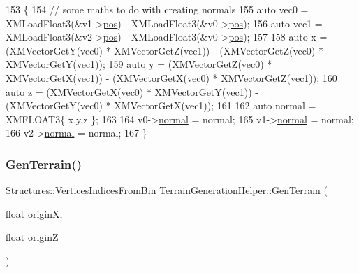 \begin{DoxyCode}
153 \{
154     \textcolor{comment}{// some maths to do with creating normals}
155     \textcolor{keyword}{auto} vec0 = XMLoadFloat3(&v1->\mbox{\hyperlink{struct_structures_1_1_vertex_tex_coord_normal_ae9f706af7cd80e03ef433eff59f7419e}{pos}}) - XMLoadFloat3(&v0->\mbox{\hyperlink{struct_structures_1_1_vertex_tex_coord_normal_ae9f706af7cd80e03ef433eff59f7419e}{pos}});
156     \textcolor{keyword}{auto} vec1 = XMLoadFloat3(&v2->\mbox{\hyperlink{struct_structures_1_1_vertex_tex_coord_normal_ae9f706af7cd80e03ef433eff59f7419e}{pos}}) - XMLoadFloat3(&v0->\mbox{\hyperlink{struct_structures_1_1_vertex_tex_coord_normal_ae9f706af7cd80e03ef433eff59f7419e}{pos}});
157     
158     \textcolor{keyword}{auto} x = (XMVectorGetY(vec0) * XMVectorGetZ(vec1)) - (XMVectorGetZ(vec0) * XMVectorGetY(vec1));
159     \textcolor{keyword}{auto} y = (XMVectorGetZ(vec0) * XMVectorGetX(vec1)) - (XMVectorGetX(vec0) * XMVectorGetZ(vec1));
160     \textcolor{keyword}{auto} z = (XMVectorGetX(vec0) * XMVectorGetY(vec1)) - (XMVectorGetY(vec0) * XMVectorGetX(vec1));
161 
162     \textcolor{keyword}{auto} normal = XMFLOAT3\{ x,y,z \};
163 
164     v0->\mbox{\hyperlink{struct_structures_1_1_vertex_tex_coord_normal_a055e66f1a6cbcb24d3377168750e6b19}{normal}} = normal;
165     v1->\mbox{\hyperlink{struct_structures_1_1_vertex_tex_coord_normal_a055e66f1a6cbcb24d3377168750e6b19}{normal}} = normal;
166     v2->\mbox{\hyperlink{struct_structures_1_1_vertex_tex_coord_normal_a055e66f1a6cbcb24d3377168750e6b19}{normal}} = normal;
167 \}
\end{DoxyCode}
\mbox{\label{class_terrain_generation_helper_a65a817889d9c9dbfd94118a42115cd38}} 
\subsubsection{\texorpdfstring{Gen\+Terrain()}{GenTerrain()}}
{\footnotesize\ttfamily \mbox{\hyperlink{struct_structures_1_1_vertices_indices_from_bin}{Structures\+::\+Vertices\+Indices\+From\+Bin}} Terrain\+Generation\+Helper\+::\+Gen\+Terrain (\begin{DoxyParamCaption}\item[{float}]{originX,  }\item[{float}]{originZ }\end{DoxyParamCaption})}




